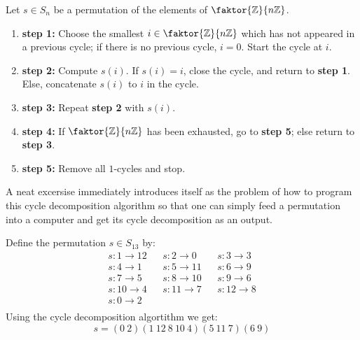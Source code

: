\begin{algorithm}
  Let $s \in S_n$ be a permutation of the elements of  $\faktor{\Z}{n\Z}$.
  \begin{enumerate}
    \item[] \textbf{step 1:} Choose the smallest $i \in \faktor{\Z}{n\Z}$
      which has not appeared in a previous cycle; if there is no previous
      cycle, $i=0$. Start the cycle at $i$.

    \item[] \textbf{step 2:} Compute $s(i)$. If $s(i)=i$, close the cycle,
      and return to \textbf{step 1}. Else, concatenate $s(i)$ to $i$ in
      the cycle.

    \item[] \textbf{step 3:} Repeat  \textbf{step 2} with $s(i)$.

    \item[] \textbf{step 4:} If $\faktor{\Z}{n\Z}$ has been exhausted, go to
      \textbf{step 5}; else return to \textbf{step 3}.

    \item[] \textbf{step 5:} Remove all $1$-cycles and stop.
  \end{enumerate}
\end{algorithm}
\begin{remark}
  A neat excersise immediately introduces itself as the problem of how to program
  this cycle decomposition algorithm so that one can simply feed a permutation
  into a computer and get its cycle decomposition as an output.
\end{remark}

\begin{example}
  Define the permutation $s \in S_{13}$ by:
  \begin{align*}
    s:1 \rightarrow 12 && s:2 \rightarrow 0 && s: 3 \rightarrow 3 \\
    s:4 \rightarrow 1 && s:5 \rightarrow 11 && s:6 \rightarrow 9 \\
    s:7 \rightarrow 5 && s:8 \rightarrow 10 && s:9 \rightarrow 6 \\
    s: 10 \rightarrow 4 && s:11 \rightarrow 7 && s:12 \rightarrow 8 \\
    s:0 \rightarrow 2 \\
  \end{align*}
  Using the cycle decomposition algortithm we get:
  \begin{equation*}
    s=(0 \ 2)(1 \ 12 \ 8 \ 10 \ 4)(5 \ 11 \ 7)(6 \ 9)
  \end{equation*}
\end{example}


